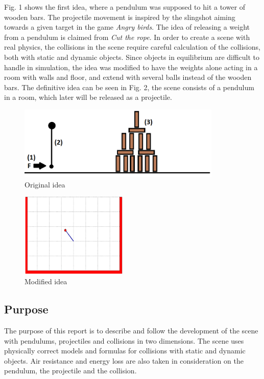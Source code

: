 \documentclass[a4paper,12pt,twoside,english]{article}
\begin{document}
Fig. 1 shows the first idea, where a pendulum was supposed to hit a tower of wooden bars. The projectile movement is inspired by the slingshot aiming towards a given target in the game {\itshape Angry birds}. The idea of releasing a weight from a pendulum is claimed from {\itshape Cut the rope}. In order to create a scene with real physics, the collisions in the scene require careful calculation of the collisions, both with static and dynamic objects. Since objects in equilibrium are difficult to handle in simulation, the idea was modified to have the weights alone acting in a room with walls and floor, and extend with several balls instead of the wooden bars. The definitive idea can be seen in Fig. 2, the scene consists of a pendulum in a room, which later will be released as a projectile.


\begin{figure}[h]
\includegraphics[height=3.5cm]{bilder/ideasketch.png}
\centering
\caption{Original idea}
\end{figure}
\begin{figure}[h]
\includegraphics[height=4cm]{bilder/Matlab_Pendulum1.png}
\centering
\caption{Modified idea}
\end{figure} 



\subsection{Purpose}
The purpose of this report is to describe and follow the development of the scene with pendulums, projectiles and collisions in two dimensions. The scene uses physically correct models and formulas for collisions with static and dynamic objects. Air resistance and energy loss are also taken in consideration on the pendulum, the projectile and the collision.
\end{document}
